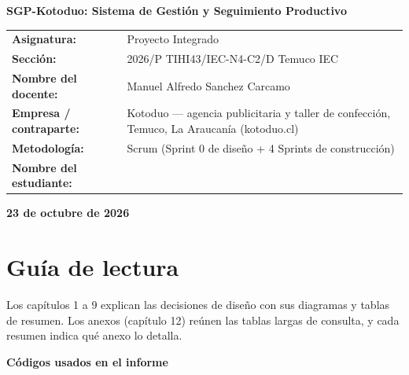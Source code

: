 \documentclass[11pt,a4paper]{article}
\newcommand{\docTitulo}{SGP-Kotoduo: Sistema de Gestión y Seguimiento Productivo}
\newcommand{\docAsignatura}{Proyecto Integrado}
\newcommand{\docSeccion}{2026/P TIHI43/IEC-N4-C2/D Temuco IEC}
\newcommand{\docDocente}{Manuel Alfredo Sanchez Carcamo}
\newcommand{\docEstudiante}{Carlos David Mac-Iver Reydet}
\newcommand{\docEmpresa}{Kotoduo --- agencia publicitaria y taller de confección, Temuco, La Araucanía (kotoduo.cl)}
\newcommand{\docMetodologia}{Scrum (Sprint 0 de diseño + 4 Sprints de construcción)}
\newcommand{\docFecha}{23 de octubre de 2026}
\begin{document}
\vspace*{\fill}

\begin{center}
    {\huge\bfseries \docTitulo}
\end{center}

\vfill
\noindent
\begin{tabular}{@{}p{5.5cm} p{9cm}@{}}
  \textbf{Asignatura:}              & \docAsignatura \\[0.4em]
  \textbf{Sección:}                 & \docSeccion \\[0.4em]
  \textbf{Nombre del docente:}      & \docDocente \\[0.4em]
  \textbf{Empresa / contraparte:}  & \docEmpresa \\[0.4em]
  \textbf{Metodología:}            & \docMetodologia \\[0.4em]
  \textbf{Nombre del estudiante:}  &
    \leavevmode{\color{inacapRed} \docEstudiante}   \\[0.15em]
\end{tabular}

\vspace{1.5cm}

\begin{center}
  \textbf{\docFecha}
\end{center}

\clearpage
\restoregeometry
\pagestyle{mainpage}

\vspace{1cm}

\tableofcontents

\newpage
\section*{Guía de lectura}

Los capítulos 1 a 9 explican las decisiones de diseño con sus diagramas y tablas de resumen. Los anexos (capítulo 12) reúnen las tablas largas de consulta, y cada resumen indica qué anexo lo detalla.

\textbf{Códigos usados en el informe}
\end{document}
